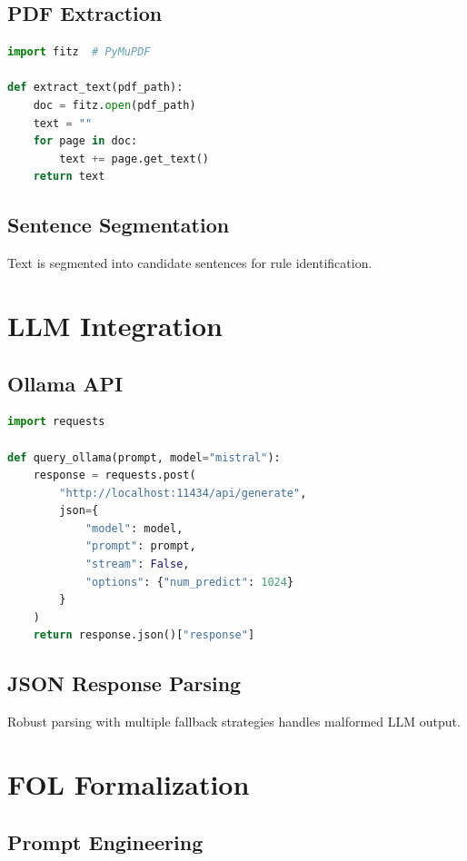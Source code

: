 \subsection{PDF Extraction}

\begin{lstlisting}[language=Python]
import fitz  # PyMuPDF

def extract_text(pdf_path):
    doc = fitz.open(pdf_path)
    text = ""
    for page in doc:
        text += page.get_text()
    return text
\end{lstlisting}

\subsection{Sentence Segmentation}

Text is segmented into candidate sentences for rule identification.

\section{LLM Integration}

\subsection{Ollama API}

\begin{lstlisting}[language=Python]
import requests

def query_ollama(prompt, model="mistral"):
    response = requests.post(
        "http://localhost:11434/api/generate",
        json={
            "model": model,
            "prompt": prompt,
            "stream": False,
            "options": {"num_predict": 1024}
        }
    )
    return response.json()["response"]
\end{lstlisting}

\subsection{JSON Response Parsing}

Robust parsing with multiple fallback strategies handles malformed LLM output.

\section{FOL Formalization}

\subsection{Prompt Engineering}

